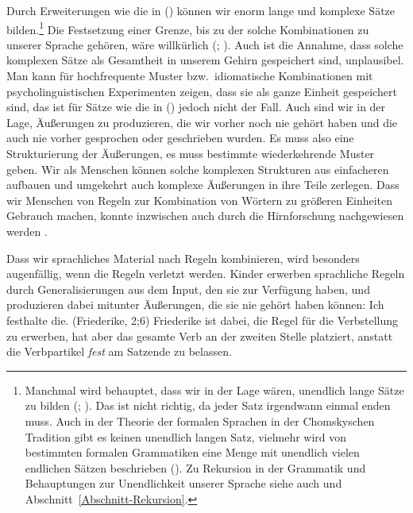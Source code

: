 \documentclass[ number=45
			   ,series=eotms
			   ,printondemand
			  ]{langsci}
\newcommand{\page}{S.\,}
\let\citew=\citealp
\begin{document}
\noindent
Durch Erweiterungen wie die in () können wir enorm lange und komplexe Sätze bilden.\footnote{
 Manchmal wird behauptet, dass wir in der Lage wären, unendlich lange Sätze zu bilden (\citealp*[\page
 117]{NKN2001a}; \citealp[\page 3]{KS2008a-u}). Das ist nicht richtig, da jeder Satz irgendwann einmal enden
 muss. Auch in der Theorie der formalen Sprachen in der Chomskyschen Tradition gibt es keinen
 unendlich langen Satz, vielmehr wird von bestimmten formalen Grammatiken eine Menge mit unendlich
 vielen endlichen Sätzen beschrieben (\citealp[\page 13]{Chomsky57a}). Zu Rekursion in
 der Grammatik und Behauptungen zur Unendlichkeit unserer Sprache siehe auch \citew{PS2010a} und
 Abschnitt~\ref{Abschnitt-Rekursion}.
}
Die Festsetzung einer Grenze, bis zu der solche Kombinationen zu unserer Sprache gehören, wäre
willkürlich (\citealp[\page 208]{Harris57a}; \citealp[\page 23]{Chomsky57a}). Auch ist die Annahme, dass
solche komplexen Sätze als Gesamtheit in unserem Gehirn gespeichert sind, unplausibel. Man kann für
hochfrequente Muster bzw.\ idiomatische Kombinationen mit psycholinguistischen Experimenten zeigen,
dass sie als ganze Einheit gespeichert sind, das ist für Sätze wie die in () jedoch nicht der
Fall. Auch sind wir in der Lage, Äußerungen zu produzieren, die wir vorher noch nie gehört haben
und die auch nie vorher gesprochen oder geschrieben wurden. Es muss also eine Strukturierung der
Äußerungen, es muss bestimmte wiederkehrende Muster geben. Wir als Menschen können solche
komplexen Strukturen aus einfacheren aufbauen und umgekehrt auch komplexe Äußerungen in ihre Teile
zerlegen. Dass wir Menschen von Regeln zur Kombination von Wörtern zu größeren Einheiten Gebrauch
machen, konnte inzwischen auch durch die Hirnforschung nachgewiesen werden \citep[\page 170]{Pulvermueller2010a}.

Dass wir sprachliches Material nach Regeln kombinieren, wird besonders augenfällig, wenn die Regeln
verletzt werden. Kinder erwerben sprachliche Regeln durch Generalisierungen aus dem
Input, den sie zur Verfügung haben, und produzieren dabei mitunter Äußerungen, die sie nie gehört
haben können: 
\ea
Ich festhalte die. (Friederike, 2;6)
\z
Friederike ist dabei, die Regel für die Verbstellung zu erwerben, hat aber das gesamte Verb
an der zweiten Stelle platziert, anstatt die Verbpartikel \emph{fest} am Satzende zu belassen.
\end{document}

